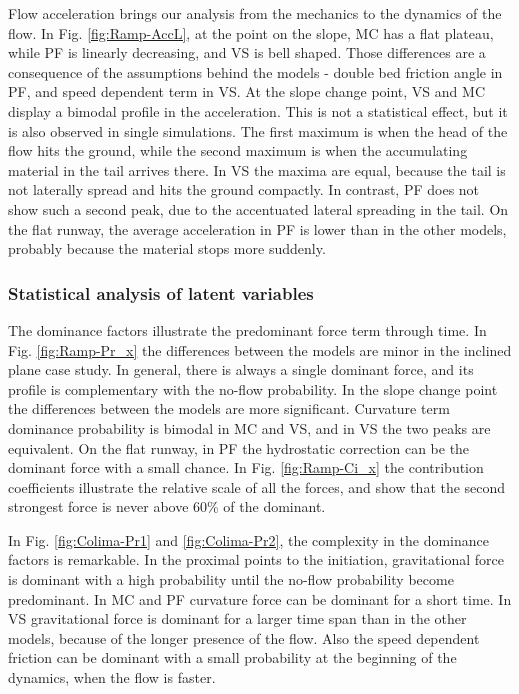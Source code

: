 \documentclass{article}
\begin{document}
Flow acceleration brings our analysis from the mechanics to the dynamics of the flow. In Fig. \ref{fig:Ramp-AccL}, at the point on the slope, MC has a flat plateau, while PF is linearly decreasing, and VS is bell shaped. Those differences are a consequence of the assumptions behind the models - double bed friction angle in PF, and speed dependent term in VS. At the slope change point, VS and MC display a bimodal profile in the acceleration. This is not a statistical effect, but it is also observed in single simulations. The first maximum is when the head of the flow hits the ground, while the second maximum is when the accumulating material in the tail arrives there. In VS the maxima are equal, because the tail is not laterally spread and hits the ground compactly. In contrast, PF does not show such a second peak, due to the accentuated lateral spreading in the tail. On the flat runway, the average acceleration in PF is lower than in the other models, probably because the material stops more suddenly.

\subsubsection{Statistical analysis of latent variables}
The dominance factors illustrate the predominant force term through time. In Fig. \ref{fig:Ramp-Pr_x} the differences between the models are minor in the inclined plane case study. In general, there is always a single dominant force, and its profile is complementary with the no-flow probability. In the slope change point the differences between the models are more significant. Curvature term dominance probability is bimodal in MC and VS, and in VS the two peaks are equivalent. On the flat runway, in PF the hydrostatic correction can be the dominant force with a small chance. In Fig. \ref{fig:Ramp-Ci_x} the contribution coefficients illustrate the relative scale of all the forces, and show that the second strongest force is never above 60\% of the dominant. 

In Fig. \ref{fig:Colima-Pr1} and \ref{fig:Colima-Pr2}, the complexity in the dominance factors is remarkable. In the proximal points to the initiation, gravitational force is dominant with a high probability until the no-flow probability become predominant. In MC and PF curvature force can be dominant for a short time. In VS gravitational force is dominant for a larger time span than in the other models, because of the longer presence of the flow. Also the speed dependent friction can be dominant with a small probability at the beginning of the dynamics, when the flow is faster.
\end{document}
